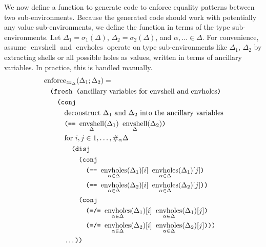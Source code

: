 \documentclass{report}
\theoremstyle{definition}
\DeclareMathOperator{\envshell}{envshell}
\DeclareMathOperator{\envholes}{envholes}
\newcommand{\eqpat}{\leftrightharpoons}
\newcommand{\eqpatD}{\eqpat_{\Delta}}
\DeclareMathOperator{\enforceeqpatD}{enforce_{\eqpatD}}
\begin{document}
We now define a function to generate code to enforce equality patterns between two sub-environments.
Because the generated code should work with potentially any value sub-environments, we define the function in terms of the type sub-environments.
Let \(\Delta_1 = \sigma_1(\Delta)\), \(\Delta_2 = \sigma_2(\Delta)\), and \(\alpha, \dots \in \Delta\).
For convenience, assume \(\envshell\) and \(\envholes\) operate on type sub-environments like \(\Delta_1\), \(\Delta_2\)
by extracting shells or all possible holes as values, written in terms of ancillary variables.
In practice, this is handled manually.
\begin{equation}
\begin{aligned}
	& \enforceeqpatD(\Delta_1; \Delta_2) = \\
	& \quad \texttt{(fresh (\textrm{ancillary variables for \(\envshell\) and \(\envholes\)})} \\
	& \quad \quad \texttt{(conj }\\
	& \quad \quad \quad \textrm{deconstruct \(\Delta_1\) and \(\Delta_2\) into the ancillary variables} \\
	& \quad \quad \quad \texttt{(== \(\envshell_\Delta(\Delta_1)\) \(\envshell_{\Delta}(\Delta_2)\))} \\
	& \quad \quad \quad \textrm{for \(i,j \in 1,\dots,\#_\alpha\Delta\)} \\
	& \quad \quad \quad \quad \texttt{(disj} \\
	& \quad \quad \quad \quad \quad \texttt{(conj} \\
	& \quad \quad \quad \quad \quad \quad \texttt{(== \(\envholes_{\alpha \in \Delta}(\Delta_1)[i]\) \(\envholes_{\alpha \in \Delta}(\Delta_1)[j]\))} \\
	& \quad \quad \quad \quad \quad \quad \texttt{(== \(\envholes_{\alpha \in \Delta}(\Delta_2)[i]\) \(\envholes_{\alpha \in \Delta}(\Delta_2)[j]\)))} \\
	& \quad \quad \quad \quad \quad \texttt{(conj} \\
	& \quad \quad \quad \quad \quad \quad \texttt{(=/= \(\envholes_{\alpha \in \Delta}(\Delta_1)[i]\) \(\envholes_{\alpha \in \Delta}(\Delta_1)[j]\))} \\
	& \quad \quad \quad \quad \quad \quad \texttt{(=/= \(\envholes_{\alpha \in \Delta}(\Delta_2)[i]\) \(\envholes_{\alpha \in \Delta}(\Delta_2)[j]\))))} \\
	& \quad \quad \quad \dots \texttt{))}
\end{aligned}
\end{equation}
\end{document}

